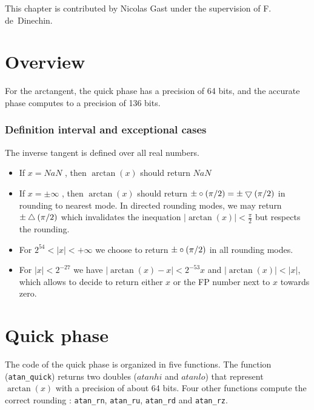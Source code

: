 This chapter is contributed by Nicolas Gast under the supervision of
F. de~Dinechin.  

\newcommand{\xred}{X_{\mathrm{red}}}
\newcommand{\xredhi}{{\mathrm{Xredhi}}}
\newcommand{\xredlo}{{\mathrm{Xredlo}}}

\section{Overview}

For the arctangent, the quick phase has a precision of 64 bits, and
the accurate phase computes to a precision of 136 bits.

\subsubsection{Definition interval and exceptional cases}

The inverse tangent is defined over all real numbers.

\begin{itemize}
\item If $x = NaN$ , then $\arctan(x)$ should return $NaN$
\item If $x = \pm\infty$ , then $\arctan(x)$ should return
$\pm\circ(\pi/2) = \pm\bigtriangledown(\pi/2)$ in rounding to nearest mode. In
directed rounding modes, we may return $\pm\bigtriangleup(\pi/2)$ which
invalidates the inequation $|\arctan(x)|<\frac{\pi}{2}$ but respects the
rounding.
\item  For $2^{54}<|x|<+\infty$ we choose to return $\pm\circ(\pi/2)$
  in all rounding modes.
\item For $|x|<2^{-27}$ we have $|\arctan(x)-x|<2^{-53}x$ and
  $|\arctan(x)|<|x|$, which allows to decide to return either $x$ or the
  FP number next to $x$ towards zero.
\end{itemize}





\section{Quick phase}

The code of the quick phase is organized in  five
functions. The function (\texttt{atan\_quick})  returns two doubles
($atanhi$ and $atanlo$) that represent $\arctan(x)$ with a precision
of about 64 bits. Four other functions compute the correct rounding :
\texttt{atan\_rn}, \texttt{atan\_ru}, \texttt{atan\_rd} and
\texttt{atan\_rz}. 


